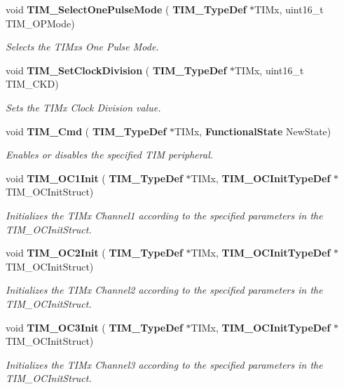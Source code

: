 \begin{DoxyCompactItemize}
void \textbf{ T\+I\+M\+\_\+\+Select\+One\+Pulse\+Mode} (\textbf{ T\+I\+M\+\_\+\+Type\+Def} $\ast$T\+I\+Mx, uint16\+\_\+t T\+I\+M\+\_\+\+O\+P\+Mode)
\begin{DoxyCompactList}\small\item\em Selects the T\+I\+Mx\textquotesingle{}s One Pulse Mode. \end{DoxyCompactList}\item 
void \textbf{ T\+I\+M\+\_\+\+Set\+Clock\+Division} (\textbf{ T\+I\+M\+\_\+\+Type\+Def} $\ast$T\+I\+Mx, uint16\+\_\+t T\+I\+M\+\_\+\+C\+KD)
\begin{DoxyCompactList}\small\item\em Sets the T\+I\+Mx Clock Division value. \end{DoxyCompactList}\item 
void \textbf{ T\+I\+M\+\_\+\+Cmd} (\textbf{ T\+I\+M\+\_\+\+Type\+Def} $\ast$T\+I\+Mx, \textbf{ Functional\+State} New\+State)
\begin{DoxyCompactList}\small\item\em Enables or disables the specified T\+IM peripheral. \end{DoxyCompactList}\item 
void \textbf{ T\+I\+M\+\_\+\+O\+C1\+Init} (\textbf{ T\+I\+M\+\_\+\+Type\+Def} $\ast$T\+I\+Mx, \textbf{ T\+I\+M\+\_\+\+O\+C\+Init\+Type\+Def} $\ast$T\+I\+M\+\_\+\+O\+C\+Init\+Struct)
\begin{DoxyCompactList}\small\item\em Initializes the T\+I\+Mx Channel1 according to the specified parameters in the T\+I\+M\+\_\+\+O\+C\+Init\+Struct. \end{DoxyCompactList}\item 
void \textbf{ T\+I\+M\+\_\+\+O\+C2\+Init} (\textbf{ T\+I\+M\+\_\+\+Type\+Def} $\ast$T\+I\+Mx, \textbf{ T\+I\+M\+\_\+\+O\+C\+Init\+Type\+Def} $\ast$T\+I\+M\+\_\+\+O\+C\+Init\+Struct)
\begin{DoxyCompactList}\small\item\em Initializes the T\+I\+Mx Channel2 according to the specified parameters in the T\+I\+M\+\_\+\+O\+C\+Init\+Struct. \end{DoxyCompactList}\item 
void \textbf{ T\+I\+M\+\_\+\+O\+C3\+Init} (\textbf{ T\+I\+M\+\_\+\+Type\+Def} $\ast$T\+I\+Mx, \textbf{ T\+I\+M\+\_\+\+O\+C\+Init\+Type\+Def} $\ast$T\+I\+M\+\_\+\+O\+C\+Init\+Struct)
\begin{DoxyCompactList}\small\item\em Initializes the T\+I\+Mx Channel3 according to the specified parameters in the T\+I\+M\+\_\+\+O\+C\+Init\+Struct. \end{DoxyCompactList}\item 

\end{DoxyCompactItemize}
